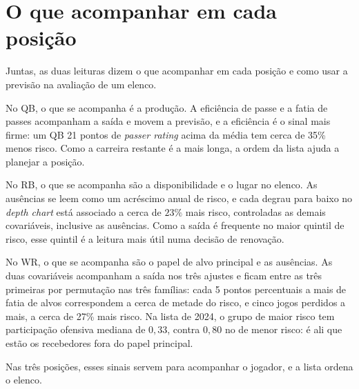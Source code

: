 \section{O que acompanhar em cada posição}
\label{sec:discussao_elenco}

Juntas, as duas leituras dizem o que acompanhar em cada posição e como usar a previsão na avaliação de um elenco.

No QB, o que se acompanha é a produção. A eficiência de passe e a fatia de passes acompanham a saída e movem a previsão, e a eficiência é o sinal mais firme: um QB 21 pontos de \textit{passer rating} acima da média tem cerca de 35\% menos risco. Como a carreira restante é a mais longa, a ordem da lista ajuda a planejar a posição.

No RB, o que se acompanha são a disponibilidade e o lugar no elenco. As ausências se leem como um acréscimo anual de risco, e cada degrau para baixo no \textit{depth chart} está associado a cerca de $23\%$ mais risco, controladas as demais covariáveis, inclusive as ausências. Como a saída é frequente no maior quintil de risco, esse quintil é a leitura mais útil numa decisão de renovação.

No WR, o que se acompanha são o papel de alvo principal e as ausências. As duas covariáveis acompanham a saída nos três ajustes e ficam entre as três primeiras por permutação nas três famílias: cada 5 pontos percentuais a mais de fatia de alvos correspondem a cerca de metade do risco, e cinco jogos perdidos a mais, a cerca de 27\% mais risco. Na lista de 2024, o grupo de maior risco tem participação ofensiva mediana de $0{,}33$, contra $0{,}80$ no de menor risco: é ali que estão os recebedores fora do papel principal.

Nas três posições, esses sinais servem para acompanhar o jogador, e a lista ordena o elenco.
